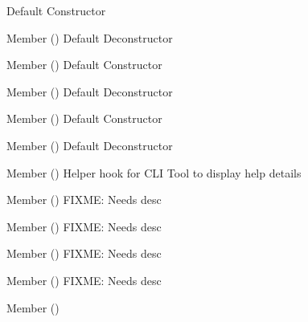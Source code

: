 \begin{DoxyRefList}
%
Default Constructor  
\item[Member \doxylink{class_help_helping_af2fb8c57ee830114069548a27bbca106}{Help\+Helping\+::\texorpdfstring{$\sim$}{\string~}\+Help\+Helping} ()]\label{todo__todo000164}%
%
Default Deconstructor  
\item[Member \doxylink{class_help_item_a7310f914ba27d3ac73e24ba60a7c91a4}{Help\+Item\+::Help\+Item} ()]\label{todo__todo000180}%
%
Default Constructor  
\item[Member \doxylink{class_help_item_a5989ffb2cf044cd33a32f5e2e6434ae7}{Help\+Item\+::\texorpdfstring{$\sim$}{\string~}\+Help\+Item} ()]\label{todo__todo000181}%
%
Default Deconstructor  
\item[Member \doxylink{class_help_player_ae14e84057c82f5f338a8b753a4b4b85b}{Help\+Player\+::Help\+Player} ()]\label{todo__todo000182}%
%
Default Constructor  
\item[Member \doxylink{class_help_player_aef6d9870c38a006d310fb81af7de2e52}{Help\+Player\+::\texorpdfstring{$\sim$}{\string~}\+Help\+Player} ()]\label{todo__todo000183}%
%
Default Deconstructor  
\item[Member \doxylink{class_help_suite_ae0f3c1a652bbb4f4817ad0c25fa14452}{Help\+Suite\+::\+\_\+help} ()]\label{todo__todo000177}%
%
Helper hook for CLI Tool to display help details  
\item[Member \doxylink{class_help_suite_a83d8aceeefa33fe8b985464754cb51c6}{Help\+Suite\+::Actor\+Help} ()]\label{todo__todo000168}%
%
FIXME\+: Needs desc  
\item[Member \doxylink{class_help_suite_ae4213d0430b7b36d2fe0f27c3144c8d7}{Help\+Suite\+::Balance\+Help} ()]\label{todo__todo000169}%
%
FIXME\+: Needs desc  
\item[Member \doxylink{class_help_suite_a122d302a4cbac4efb6760ef36d8a3c26}{Help\+Suite\+::Battle\+Help} ()]\label{todo__todo000170}%
%
FIXME\+: Needs desc  
\item[Member \doxylink{class_help_suite_a77fff93a8852e6feaf895236b18316b1}{Help\+Suite\+::Combat\+Help} ()]\label{todo__todo000171}%
%
FIXME\+: Needs desc  
\item[Member \doxylink{class_help_suite_a822e14c21f359c93ee97774ac58a48a7}{Help\+Suite\+::Help\+All} ()]\label{todo__todo000167}%

\end{DoxyRefList}
